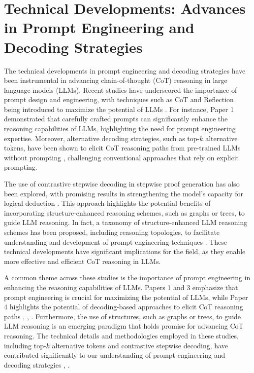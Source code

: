 \documentclass[conference]{IEEEtran}
\begin{document}
\section{Technical Developments: Advances in Prompt Engineering and Decoding Strategies}
The technical developments in prompt engineering and decoding strategies have been instrumental in advancing chain-of-thought (CoT) reasoning in large language models (LLMs). Recent studies have underscored the importance of prompt design and engineering, with techniques such as CoT and Reflection being introduced to maximize the potential of LLMs \cite{b1}. For instance, Paper 1 demonstrated that carefully crafted prompts can significantly enhance the reasoning capabilities of LLMs, highlighting the need for prompt engineering expertise. Moreover, alternative decoding strategies, such as top-$k$ alternative tokens, have been shown to elicit CoT reasoning paths from pre-trained LLMs without prompting \cite{b4}, challenging conventional approaches that rely on explicit prompting.

The use of contrastive stepwise decoding in stepwise proof generation has also been explored, with promising results in strengthening the model's capacity for logical deduction \cite{b5}. This approach highlights the potential benefits of incorporating structure-enhanced reasoning schemes, such as graphs or trees, to guide LLM reasoning. In fact, a taxonomy of structure-enhanced LLM reasoning schemes has been proposed, including reasoning topologies, to facilitate understanding and development of prompt engineering techniques \cite{b3}. These technical developments have significant implications for the field, as they enable more effective and efficient CoT reasoning in LLMs.

A common theme across these studies is the importance of prompt engineering in enhancing the reasoning capabilities of LLMs. Papers 1 and 3 emphasize that prompt engineering is crucial for maximizing the potential of LLMs, while Paper 4 highlights the potential of decoding-based approaches to elicit CoT reasoning paths \cite{b1}, \cite{b3}, \cite{b4}. Furthermore, the use of structures, such as graphs or trees, to guide LLM reasoning is an emerging paradigm that holds promise for advancing CoT reasoning. The technical details and methodologies employed in these studies, including top-$k$ alternative tokens and contrastive stepwise decoding, have contributed significantly to our understanding of prompt engineering and decoding strategies \cite{b4}, \cite{b5}.
\end{document}
